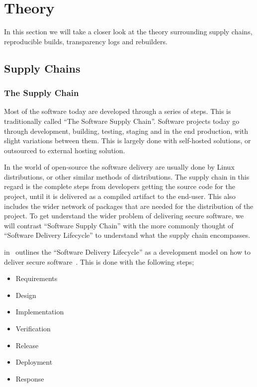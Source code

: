 \documentclass[../Main/thesis.tex]{subfiles}
\begin{document}
\chapter{Theory}
\label{ch:theory}
In this section we will take a closer look at the theory surrounding
supply chains, reproducible builds, transparency logs and rebuilders.


\section{Supply Chains}\label{sec:supply_chain}
\subsection*{The Supply Chain}
Most of the software today are developed through a series of steps. This is
traditionally called ``The Software Supply Chain''. Software projects today go
through development, building, testing, staging and in the end production, with
slight variations between them. This is largely done with self-hosted solutions,
or outsourced to external hosting solution.

In the world of open-source the software delivery are usually done by Linux
distributions, or other similar methods of distributions. The supply chain in
this regard is the complete steps from developers getting the source code for
the project, until it is delivered as a compiled artifact to the end-user. This
also includes the wider network of packages that are needed for the distribution
of the project. To get understand the wider problem of delivering secure
software, we will contrast ``Software Supply Chain'' with the more commonly
thought of ``Software Delivery Lifecycle'' to understand what the supply chain
encompasses.

\citeauthor{10.1109CSAC.2004.41} in~ outlines the
``Software Delivery Lifecycle'' as a development model on how to deliver secure
software~\cite{10.1109CSAC.2004.41}. This is done with the following steps;

\begin{itemize}
    \item Requirements
    \item Design
    \item Implementation
    \item Verification 
    \item Release
    \item Deployment
    \item Response
\end{itemize}
\end{document}
